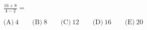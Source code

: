 

$\frac{16+8}{4-2}=$

$\text{(A)}\ 4 \qquad \text{(B)}\ 8 \qquad \text{(C)}\ 12 \qquad \text{(D)}\ 16 \qquad \text{(E)}\ 20$
